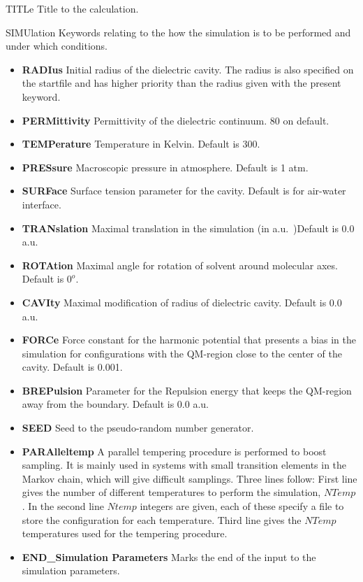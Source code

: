 \begin{keywordlist}
\item[TITLe]
Title to the calculation.
\item[SIMUlation]
Keywords relating to the how the simulation is to be performed and under
which conditions.
\begin{itemize}
\item {\bf RADIus} Initial radius of the dielectric cavity. The radius is also
specified on the startfile and has higher priority than the radius given
with the present keyword.
\item {\bf PERMittivity} Permittivity of the dielectric continuum. 80 on
default.
\item {\bf TEMPerature} Temperature in Kelvin. Default is 300.
\item {\bf PRESsure} Macroscopic pressure in atmosphere. Default is 1 atm.
\item {\bf SURFace} Surface tension parameter for the cavity. Default is
for air-water interface.
\item {\bf TRANslation} Maximal translation in the simulation
(in a.u.~)Default is 0.0 a.u.
\item {\bf ROTAtion} Maximal angle for rotation of solvent around
molecular axes. Default is $0^o$.
\item {\bf CAVIty} Maximal modification of radius of dielectric cavity.
Default is 0.0 a.u.
\item {\bf FORCe} Force constant for the harmonic potential that presents
a bias in the simulation for configurations with the QM-region close
to the center of the cavity. Default is 0.001.
\item {\bf BREPulsion} Parameter for the Repulsion energy that keeps the QM-region away from the boundary. Default is 0.0 a.u.
\item {\bf SEED} Seed to the pseudo-random number generator.
\item {\bf PARAlleltemp} A parallel tempering procedure is performed to boost sampling. It is mainly used in systems with small transition elements in the Markov chain, which will give difficult samplings. Three lines follow: First line
gives the number of different temperatures to perform the simulation, $NTemp$. In the second line $Ntemp$ integers are given, each of these specify a file to store the configuration for each temperature. Third line gives the $NTemp$ temperatures used
for the tempering procedure.
\item {\bf END\_Simulation Parameters} Marks the end of the input to the simulation parameters.

\end{itemize}
\end{keywordlist}
